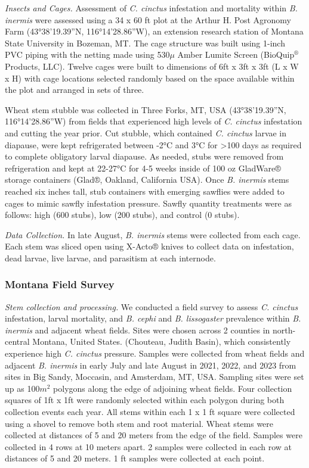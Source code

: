 \documentclass[
]{article}
\begin{document}
\emph{Insects and Cages.} Assessment of \emph{C. cinctus} infestation
and mortality within \emph{B. inermis} were assessed using a 34 x 60 ft
plot at the Arthur H. Post Agronomy Farm (43°38'19.39''N,
116°14'28.86''W), an extension research station of Montana State
University in Bozeman, MT. The cage structure was built using 1-inch PVC
piping with the netting made using 530\(\mu\) Amber Lumite Screen
(BioQuip\(^\circledR\) Products, LLC). Twelve cages were built to
dimensions of 6ft x 3ft x 3ft (L x W x H) with cage locations selected
randomly based on the space available within the plot and arranged in
sets of three.

Wheat stem stubble was collected in Three Forks, MT, USA
(43°38'19.39''N, 116°14'28.86''W) from fields that experienced high
levels of \emph{C. cinctus} infestation and cutting the year prior. Cut
stubble, which contained \emph{C. cinctus} larvae in diapause, were kept
refrigerated between -2°C and 3°C for \textgreater100 days as required
to complete obligatory larval diapause. As needed, stubs were removed
from refrigeration and kept at 22-27°C for 4-5 weeks inside of 100 oz
GladWare® storage containers (Glad®, Oakland, California USA). Once
\emph{B. inermis} stems reached six inches tall, stub containers with
emerging sawflies were added to cages to mimic sawfly infestation
pressure. Sawfly quantity treatments were as follows: high (600 stubs),
low (200 stubs), and control (0 stubs).

\emph{Data Collection.} In late August, \emph{B. inermis} stems were
collected from each cage. Each stem was sliced open using X-Acto® knives
to collect data on infestation, dead larvae, live larvae, and parasitism
at each internode.

\subsubsection{Montana Field Survey}\label{montana-field-survey}

\emph{Stem collection and processing.} We conducted a field survey to
assess \emph{C. cinctus} infestation, larval mortality, and \emph{B.
cephi} and \emph{B. lissogaster} prevalence within \emph{B. inermis} and
adjacent wheat fields. Sites were chosen across 2 counties in
north-central Montana, United States. (Chouteau, Judith Basin), which
consistently experience high \emph{C. cinctus} pressure. Samples were
collected from wheat fields and adjacent \emph{B. inermis} in early July
and late August in 2021, 2022, and 2023 from sites in Big Sandy,
Moccasin, and Amsterdam, MT, USA. Sampling sites were set up as
100\(m^2\) polygons along the edge of adjoining wheat fields. Four
collection squares of 1ft x 1ft were randomly selected within each
polygon during both collection events each year. All stems within each 1
x 1 ft square were collected using a shovel to remove both stem and root
material. Wheat stems were collected at distances of 5 and 20 meters
from the edge of the field. Samples were collected in 4 rows at 10
meters apart. 2 samples were collected in each row at distances of 5 and
20 meters. 1 ft samples were collected at each point.
\end{document}
